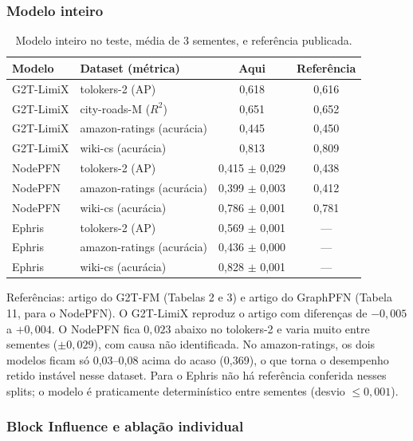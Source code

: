 \documentclass[12pt,a4paper]{article}
\begin{document}
\subsubsection{Modelo inteiro}

\begin{table}[H]
\centering
\caption{Modelo inteiro no teste, média de 3 sementes, e referência publicada.}
\label{tab:novos-inteiro}
\begin{tabular}{@{}llcc@{}}
\toprule
Modelo & Dataset (métrica) & Aqui & Referência \\
\midrule
G2T-LimiX & tolokers-2 (AP)           & 0,618 & 0,616 \\
G2T-LimiX & city-roads-M ($R^2$)      & 0,651 & 0,652 \\
G2T-LimiX & amazon-ratings (acurácia) & 0,445 & 0,450 \\
G2T-LimiX & wiki-cs (acurácia)        & 0,813 & 0,809 \\
\midrule
NodePFN   & tolokers-2 (AP)           & 0,415 $\pm$ 0,029 & 0,438 \\
NodePFN   & amazon-ratings (acurácia) & 0,399 $\pm$ 0,003 & 0,412 \\
NodePFN   & wiki-cs (acurácia)        & 0,786 $\pm$ 0,001 & 0,781 \\
\midrule
Ephris    & tolokers-2 (AP)           & 0,569 $\pm$ 0,001 & --- \\
Ephris    & amazon-ratings (acurácia) & 0,436 $\pm$ 0,000 & --- \\
Ephris    & wiki-cs (acurácia)        & 0,828 $\pm$ 0,001 & --- \\
\bottomrule
\end{tabular}
\end{table}

\noindent Referências: artigo do G2T-FM (Tabelas 2 e 3) e artigo do GraphPFN (Tabela 11, para o NodePFN). O G2T-LimiX reproduz o artigo com diferenças de $-0{,}005$ a $+0{,}004$. O NodePFN fica $0{,}023$ abaixo no tolokers-2 e varia muito entre sementes ($\pm 0{,}029$), com causa não identificada. No amazon-ratings, os dois modelos ficam só 0,03--0,08 acima do acaso (0,369), o que torna o desempenho retido instável nesse dataset. Para o Ephris não há referência conferida nesses splits; o modelo é praticamente determinístico entre sementes (desvio $\leq 0{,}001$).

\subsubsection{Block Influence e ablação individual}
\end{document}
